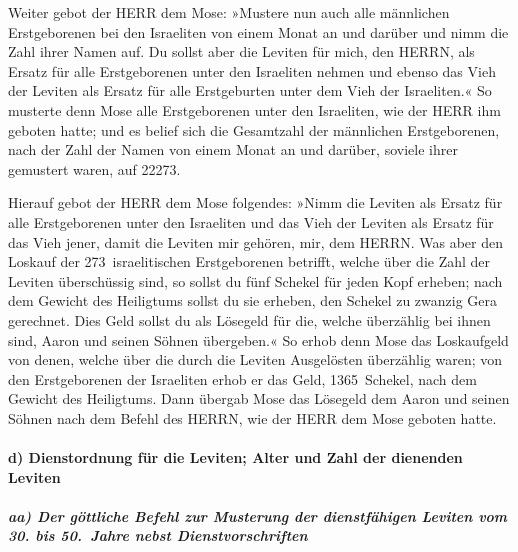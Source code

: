 Weiter gebot der HERR dem Mose: »Mustere nun auch alle
männlichen Erstgeborenen bei den Israeliten von einem Monat an und
darüber und nimm die Zahl ihrer Namen auf. Du sollst aber
die Leviten für mich, den HERRN, als Ersatz für alle Erstgeborenen unter
den Israeliten nehmen und ebenso das Vieh der Leviten als Ersatz für
alle Erstgeburten unter dem Vieh der Israeliten.« So
musterte denn Mose alle Erstgeborenen unter den Israeliten, wie der HERR
ihm geboten hatte; und es belief sich die Gesamtzahl der
männlichen Erstgeborenen, nach der Zahl der Namen von einem Monat an und
darüber, soviele ihrer gemustert waren, auf 22273.

Hierauf gebot der HERR dem Mose folgendes:
»Nimm die Leviten als Ersatz für alle Erstgeborenen unter
den Israeliten und das Vieh der Leviten als Ersatz für das Vieh jener,
damit die Leviten mir gehören, mir, dem HERRN. Was aber
den Loskauf der 273~israelitischen Erstgeborenen betrifft, welche über
die Zahl der Leviten überschüssig sind, so sollst du fünf
Schekel für jeden Kopf erheben; nach dem Gewicht des Heiligtums sollst
du sie erheben, den Schekel zu zwanzig Gera gerechnet.
Dies Geld sollst du als Lösegeld für die, welche
überzählig bei ihnen sind, Aaron und seinen Söhnen übergeben.«
So erhob denn Mose das Loskaufgeld von denen, welche über
die durch die Leviten Ausgelösten überzählig waren; von
den Erstgeborenen der Israeliten erhob er das Geld, 1365~Schekel, nach
dem Gewicht des Heiligtums. Dann übergab Mose das
Lösegeld dem Aaron und seinen Söhnen nach dem Befehl des HERRN, wie der
HERR dem Mose geboten hatte.

\hypertarget{d-dienstordnung-fuxfcr-die-leviten-alter-und-zahl-der-dienenden-leviten}{%
\paragraph{d) Dienstordnung für die Leviten; Alter und Zahl der
dienenden
Leviten}\label{d-dienstordnung-fuxfcr-die-leviten-alter-und-zahl-der-dienenden-leviten}}

\hypertarget{aa-der-guxf6ttliche-befehl-zur-musterung-der-dienstfuxe4higen-leviten-vom-30.-bis-50.-jahre-nebst-dienstvorschriften}{%
\subparagraph{aa) Der göttliche Befehl zur Musterung der dienstfähigen
Leviten vom 30. bis 50.~Jahre nebst
Dienstvorschriften}\label{aa-der-guxf6ttliche-befehl-zur-musterung-der-dienstfuxe4higen-leviten-vom-30.-bis-50.-jahre-nebst-dienstvorschriften}}

